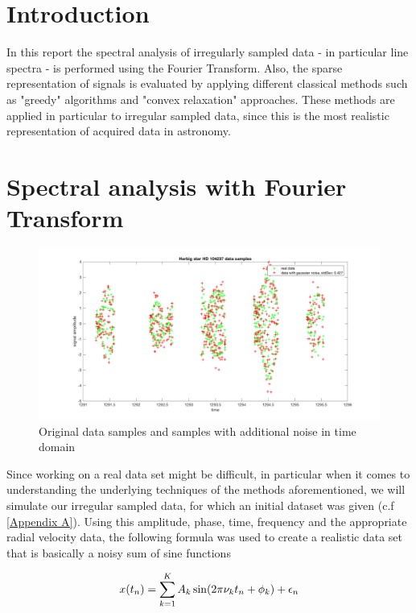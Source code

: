 
\section{Introduction}
In this report the spectral analysis of irregularly sampled data - in particular line spectra - is performed using the Fourier Transform. Also, the sparse representation of signals is evaluated by applying different classical methods such as "greedy" algorithms and "convex relaxation" approaches. These methods are applied in particular to irregular sampled data, since this is the most realistic representation of acquired data in astronomy.


\section{Spectral analysis with Fourier Transform}
\begin{figure}[h!]
	\centering
	\includegraphics[width=\textwidth]{images/data}
	\caption{Original data samples and samples with additional noise in time domain}
	\label{fig:data}
\end{figure}
Since working on a real data set might be difficult, in particular when it comes to understanding the underlying techniques of the methods aforementioned, we will simulate our irregular sampled data, for which an initial dataset was given (c.f \cref{Appendix A}).
Using this amplitude, phase, time, frequency and the appropriate radial velocity data, the following formula was used to create a realistic data set that is basically a noisy sum of sine functions

\begin{equation}
	\centering
	x(t_n) = \sum_{k=1}^K A_k \sin(2\pi\nu_kt_n + \phi_k) + \epsilon_n
	\label{eq:sinesum}
\end{equation}

